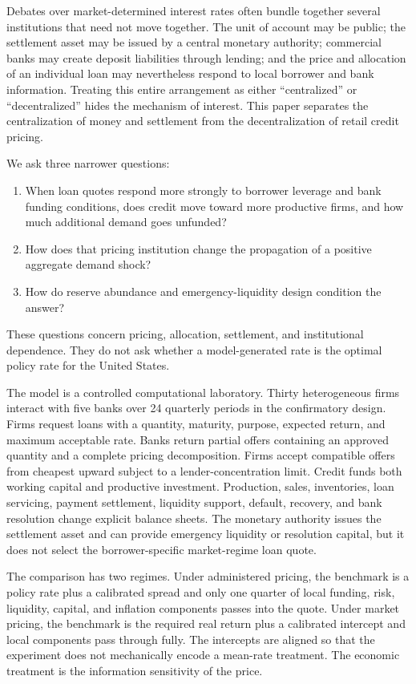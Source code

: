 \documentclass[11pt,a4paper]{article}
\begin{document}
Debates over market-determined interest rates often bundle together several institutions that need not move together. The unit of account may be public; the settlement asset may be issued by a central monetary authority; commercial banks may create deposit liabilities through lending; and the price and allocation of an individual loan may nevertheless respond to local borrower and bank information. Treating this entire arrangement as either ``centralized'' or ``decentralized'' hides the mechanism of interest. This paper separates the centralization of money and settlement from the decentralization of retail credit pricing.

We ask three narrower questions:
\begin{enumerate}
    \item When loan quotes respond more strongly to borrower leverage and bank funding conditions, does credit move toward more productive firms, and how much additional demand goes unfunded?
    \item How does that pricing institution change the propagation of a positive aggregate demand shock?
    \item How do reserve abundance and emergency-liquidity design condition the answer?
\end{enumerate}
These questions concern pricing, allocation, settlement, and institutional dependence. They do not ask whether a model-generated rate is the optimal policy rate for the United States.

The model is a controlled computational laboratory. Thirty heterogeneous firms interact with five banks over 24 quarterly periods in the confirmatory design. Firms request loans with a quantity, maturity, purpose, expected return, and maximum acceptable rate. Banks return partial offers containing an approved quantity and a complete pricing decomposition. Firms accept compatible offers from cheapest upward subject to a lender-concentration limit. Credit funds both working capital and productive investment. Production, sales, inventories, loan servicing, payment settlement, liquidity support, default, recovery, and bank resolution change explicit balance sheets. The monetary authority issues the settlement asset and can provide emergency liquidity or resolution capital, but it does not select the borrower-specific market-regime loan quote.

The comparison has two regimes. Under administered pricing, the benchmark is a policy rate plus a calibrated spread and only one quarter of local funding, risk, liquidity, capital, and inflation components passes into the quote. Under market pricing, the benchmark is the required real return plus a calibrated intercept and local components pass through fully. The intercepts are aligned so that the experiment does not mechanically encode a mean-rate treatment. The economic treatment is the information sensitivity of the price.
\end{document}
